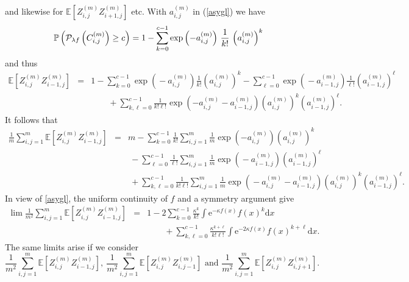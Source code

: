 \documentclass[12pt]{article}
\def\PP{\mathbb{P}}
\def\BE{\mathbb{E}}
\begin{document}
and likewise for $\BE \left[Z_{i,j}^{(m)} Z_{i+1,j}^{(m)}\right] $ etc. With $a^{(m)}_{i,j}$ in (\ref{asygl}) we have
\begin{equation}\label{Plambdaf}
\PP \left({\cal P}_{\lambda f}\left(C^{(m)}_{i,j}\right) \ge c \right) = 1- \sum_{k=0}^{c-1} \exp\left(-  a^{(m)}_{i,j} \right) \, \frac{1}{k!} \, \left(a^{(m)}_{i,j} \right)^k
\end{equation}
and thus
\begin{eqnarray*}
\BE \left[Z_{i,j}^{(m)} Z_{i-1,j}^{(m)}\right] & = & 1 \! - \! \sum_{k=0}^{c-1} \! \exp \! \left( \! -  a^{(m)}_{i,j} \right) \frac{1}{k!}  \left( \! a^{(m)}_{i,j} \! \right)^k
- \sum_{\ell=0}^{c-1} \! \exp \! \left(\! -  a^{(m)}_{i-1,j}
 \right) \frac{1}{\ell!}  \left(\! a^{(m)}_{i-1,j} \!
 \right)^\ell\\
 & & \qquad + \sum_{k,\ell=0}^{c-1} \frac{1}{k!\ell!} \exp\left(-  a^{(m)}_{i,j} - a^{(m)}_{i-1,j} \right) \left(a^{(m)}_{i,j} \right)^k \left(a^{(m)}_{i-1,j} \right)^\ell .
\end{eqnarray*}
It follows that
\begin{eqnarray*}
\frac{1}{m} \sum_{i,j=1}^m \BE \left[Z_{i,j}^{(m)} Z_{i-1,j}^{(m)}\right] & = & m - \sum_{k=0}^{c-1} \frac{1}{k!} \sum_{i,j=1}^m \frac{1}{m} \exp\left(-  a^{(m)}_{i,j} \right) \left(a^{(m)}_{i,j} \right)^k\\
& & \ - \sum_{\ell=0}^{c-1} \frac{1}{\ell!} \sum_{i,j=1}^m \frac{1}{m} \exp \! \left(\! -  a^{(m)}_{i-1,j} \!  \right) \!  \left( \! a^{(m)}_{i-1,j} \! \right)^\ell\\
 & & \ + \sum_{k,\ell=0}^{c-1} \frac{1}{k!\ell!} \sum_{i,j=1}^m \frac{1}{m} \! \exp\! \left(\! -  a^{(m)}_{i,j}\! - \! a^{(m)}_{i-1,j} \! \right)
 \left(\! a^{(m)}_{i,j} \! \right)^k \! \left(\! a^{(m)}_{i-1,j} \! \right)^\ell .
\end{eqnarray*}
In view of \eqref{asygl}, the uniform continuity of $f$ and a symmetry argument give
\begin{eqnarray*}
\lim \frac{1}{m^2} \sum_{i,j=1}^m \BE \left[Z_{i,j}^{(m)} Z_{i-1,j}^{(m)}\right] & = & 1 - 2 \sum_{k=0}^{c-1} \frac{\kappa^k}{k!} \int \mbox{e}^{-\kappa f(x)} f(x)^k \mbox{d} x\\
& & \qquad + \sum_{k,\ell=0}^{c-1} \frac{\kappa^{k+\ell}}{k!\ell!} \int \textrm{e}^{-2\kappa f(x)} f(x)^{k+\ell} \mbox{d} x.
\end{eqnarray*}
The same limits arise if we consider
$$
\frac{1}{m^2} \sum_{i,j=1}^m \BE \left[Z_{i,j}^{(m)} Z_{i-1,j}^{(m)}\right], \ \frac{1}{m^2} \sum_{i,j=1}^m \BE \left[Z_{i,j}^{(m)} Z_{i,j-1}^{(m)}\right] \mbox{ and }
\frac{1}{m^2} \sum_{i,j=1}^m \BE \left[Z_{i,j}^{(m)} Z_{i,j+1}^{(m)}\right].
$$
\end{document}
